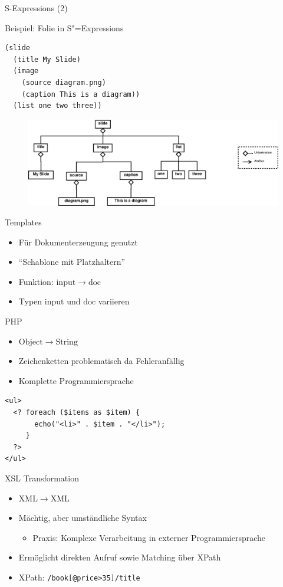 \documentclass{beamer}
\newcommand{\pfeil}{\item[$\Rightarrow$]}
\newcommand\ato{\rightarrow} %
\newcommand{\sexps}{S"=Expressions}
\begin{document}
\begin{frame}[fragile]{S-Expressions (2)}
  \begin{block}{Beispiel: Folie in \sexps{}}
\begin{verbatim}
(slide
  (title My Slide)
  (image
    (source diagram.png)
    (caption This is a diagram))
  (list one two three))
\end{verbatim}
  \end{block}
  \begin{figure}
    \includegraphics[scale=0.2]{images/model_slide_sexp}
  \end{figure}
\end{frame}

\begin{frame}[fragile]{Templates}
  \begin{itemize}
  \item Für Dokumenterzeugung genutzt
  \item ``Schablone mit Platzhaltern''
  \item Funktion: $\mathrm{input} \ato \mathrm{doc}$
  \item Typen $\mathrm{input}$ und $\mathrm{doc}$ variieren
  \end{itemize}
\end{frame}

\begin{frame}[fragile]{PHP}
  \begin{itemize}
  \item $\mathrm{Object}\ato\mathrm{String}$
  \item Zeichenketten problematisch da Fehleranfällig
  \item Komplette Programmiersprache
  \end{itemize}
\begin{verbatim}
<ul>
  <? foreach ($items as $item) {
       echo("<li>" . $item . "</li>");
     }
  ?>
</ul>
\end{verbatim}
\end{frame}

\begin{frame}[fragile]{XSL Transformation}
  \begin{itemize}
  \item $\mathrm{XML} \ato \mathrm{XML}$
  \item Mächtig, aber umständliche Syntax
    \begin{itemize}
    \pfeil Praxis: Komplexe Verarbeitung in externer
      Programmiersprache
    \end{itemize}
  \item Ermöglicht direkten Aufruf sowie Matching über XPath
  \item XPath: \verb+/book[@price>35]/title+
  \end{itemize}
\end{frame}
\end{document}
